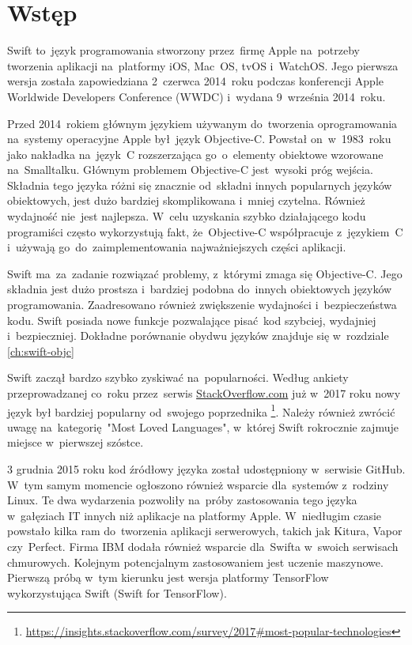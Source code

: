 \documentclass[mgr, shortabstract]{iithesis}
\author         {Maksymilian Debeściak}
\begin{document}

\chapter{Wstęp}
\label{ch:wstep}

Swift to~język programowania stworzony przez~firmę Apple na~potrzeby tworzenia aplikacji na~platformy iOS, Mac~OS, tvOS i~WatchOS. Jego pierwsza wersja została zapowiedziana 2~czerwca 2014~roku podczas konferencji Apple Worldwide Developers Conference (WWDC) i~wydana 9~września 2014~roku.

Przed 2014~rokiem głównym językiem używanym do~tworzenia oprogramowania na~systemy operacyjne Apple był~język Objective-C. Powstał on~w~1983~roku jako nakładka na~język~C rozszerzająca go~o~elementy obiektowe wzorowane na~Smalltalku. Głównym problemem Objective-C jest~wysoki próg wejścia. Składnia tego języka różni się znacznie od~składni innych popularnych języków obiektowych, jest dużo bardziej skomplikowana i~mniej czytelna. Również wydajność nie~jest najlepsza. W~celu uzyskania szybko działającego kodu programiści często wykorzystują fakt, że~Objective-C współpracuje z~językiem~C i~używają go~do~zaimplementowania najważniejszych części aplikacji. 

Swift ma~za~zadanie rozwiązać problemy, z~którymi zmaga się Objective-C. Jego składnia jest dużo prostsza i~bardziej podobna do~innych obiektowych języków programowania. Zaadresowano również zwiększenie wydajności i~bezpieczeństwa kodu. Swift posiada nowe funkcje pozwalające pisać kod szybciej, wydajniej i~bezpieczniej. Dokładne porównanie obydwu języków znajduje się w~rozdziale \ref{ch:swift-objc}

Swift zaczął bardzo szybko zyskiwać na~popularności. Według ankiety przeprowadzanej co~roku przez~serwis \url{StackOverflow.com} już w~2017 roku nowy język był bardziej popularny od~swojego poprzednika \footnote{\url{https://insights.stackoverflow.com/survey/2017\#most-popular-technologies}}. Należy również zwrócić uwagę na~kategorię "Most Loved Languages", w~której Swift rokrocznie zajmuje miejsce w~pierwszej szóstce.

3 grudnia 2015 roku kod źródłowy języka został udostępniony w~serwisie GitHub. W~tym samym momencie ogłoszono również wsparcie dla~systemów z~rodziny Linux. Te dwa wydarzenia pozwoliły na~próby zastosowania tego języka w~gałęziach IT innych niż aplikacje na platformy Apple. W~niedługim czasie powstało kilka ram do~tworzenia aplikacji serwerowych, takich jak Kitura, Vapor czy~Perfect. Firma IBM dodała również wsparcie dla~Swifta w~swoich serwisach chmurowych. Kolejnym potencjalnym zastosowaniem jest uczenie maszynowe. Pierwszą próbą w~tym kierunku jest wersja platformy TensorFlow wykorzystująca Swift (Swift for TensorFlow).
\end{document}
